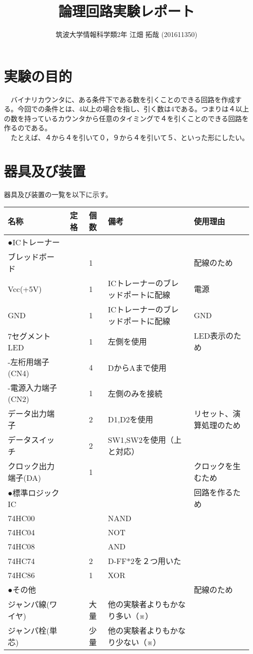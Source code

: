 \documentclass{scrartcl}
\author{筑波大学情報科学類2年 江畑 拓哉 (201611350)}
\date{}
\title{論理回路実験レポート}
\begin{document}
\maketitle


\section{実験の目的}
\label{sec:org49ea44c}
　バイナリカウンタに、ある条件下である数を引くことのできる回路を作成する。今回での条件とは、4以上の場合を指し、引く数は4である。つまりは４以上の数を持っているカウンタから任意のタイミングで４を引くことのできる回路を作るのである。\\
　たとえば、４から４を引いて０，９から４を引いて５、といった形にしたい。\\

\section{器具及び装置}
\label{sec:orgb707d57}
器具及び装置の一覧を以下に示す。\\
\begin{center}
\begin{tabular}{|l|l|l|l|l|}
\hline
名称 & 定格 & 個数 & 備考 & 使用理由\\
\hline
●ICトレーナー &  &  &  & \\
ブレッドボード &  & 1 &  & 配線のため\\
Vcc(+5V) &  & 1 & ICトレーナーのブレッドポートに配線 & 電源\\
GND &  & 1 & ICトレーナーのブレッドポートに配線 & GND\\
7セグメントLED &  & 1 & 左側を使用 & LED表示のため\\
-左桁用端子(CN4) &  & 4 & DからAまで使用 & \\
-電源入力端子(CN2) &  & 1 & 左側のみを接続 & \\
データ出力端子 &  & 2 & D1,D2を使用 & リセット、演算処理のため\\
データスイッチ &  & 2 & SW1,SW2を使用（上と対応） & \\
クロック出力端子(DA) &  & 1 &  & クロックを生むため\\
\hline
●標準ロジックIC &  &  &  & 回路を作るため\\
74HC00 &  &  & NAND & \\
74HC04 &  &  & NOT & \\
74HC08 &  &  & AND & \\
74HC74 &  & 2 & D-FF*2を２つ用いた & \\
74HC86 &  & 1 & XOR & \\
\hline
●その他 &  &  &  & 配線のため\\
ジャンパ線(ワイヤ) &  & 大量 & 他の実験者よりもかなり多い（※） & \\
ジャンパ栓(単芯) &  & 少量 & 他の実験者よりもかなり少ない（※） & \\
\hline
\end{tabular}
\end{center}
\end{document}
